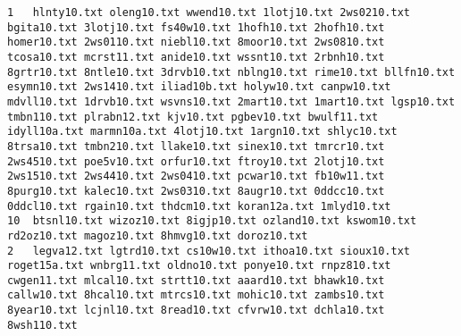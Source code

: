 \documentclass{article}
\begin{document}
\begin{lstlisting} 
1	hlnty10.txt oleng10.txt wwend10.txt 1lotj10.txt 2ws0210.txt bgita10.txt 3lotj10.txt fs40w10.txt 1hofh10.txt 2hofh10.txt homer10.txt 2ws0110.txt niebl10.txt 8moor10.txt 2ws0810.txt tcosa10.txt mcrst11.txt anide10.txt wssnt10.txt 2rbnh10.txt 8grtr10.txt 8ntle10.txt 3drvb10.txt nblng10.txt rime10.txt bllfn10.txt esymn10.txt 2ws1410.txt iliad10b.txt holyw10.txt canpw10.txt mdvll10.txt 1drvb10.txt wsvns10.txt 2mart10.txt 1mart10.txt lgsp10.txt tmbn110.txt plrabn12.txt kjv10.txt pgbev10.txt bwulf11.txt idyll10a.txt marmn10a.txt 4lotj10.txt 1argn10.txt shlyc10.txt 8trsa10.txt tmbn210.txt llake10.txt sinex10.txt tmrcr10.txt 2ws4510.txt poe5v10.txt orfur10.txt ftroy10.txt 2lotj10.txt 2ws1510.txt 2ws4410.txt 2ws0410.txt pcwar10.txt fb10w11.txt 8purg10.txt kalec10.txt 2ws0310.txt 8augr10.txt 0ddcc10.txt 0ddcl10.txt rgain10.txt thdcm10.txt koran12a.txt 1mlyd10.txt
10	btsnl10.txt wizoz10.txt 8igjp10.txt ozland10.txt kswom10.txt rd2oz10.txt magoz10.txt 8hmvg10.txt doroz10.txt
2	legva12.txt lgtrd10.txt cs10w10.txt ithoa10.txt sioux10.txt roget15a.txt wnbrg11.txt oldno10.txt ponye10.txt rnpz810.txt cwgen11.txt mlcal10.txt strtt10.txt aaard10.txt bhawk10.txt callw10.txt 8hcal10.txt mtrcs10.txt mohic10.txt zambs10.txt 8year10.txt lcjnl10.txt 8read10.txt cfvrw10.txt dchla10.txt 8wsh110.txt

\end{lstlisting}
\end{document}
